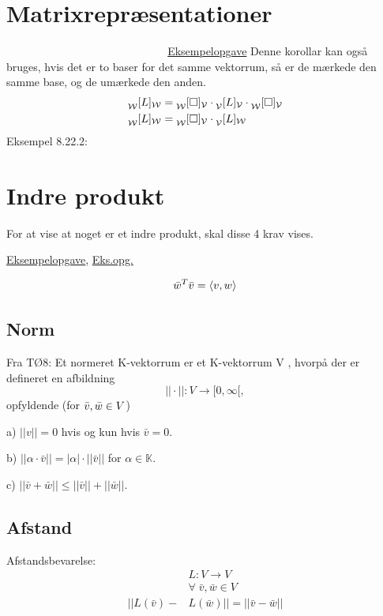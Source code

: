 \documentclass[a4paper,oneside,article]{memoir}
\begin{document}
\chapter{Matrixrepræsentationer} \label{ch:rep}
\textcolor{white}{Koordinattransformationsmatrix}
\hyperref[asc:Reeksamen 2021 opg 1]{Eksempelopgave}
Denne korollar kan også bruges, hvis det er to baser for det samme vektorrum, så er de mærkede den samme base, og de umærkede den anden. 
\begin{align*}
    \prescript{}{\mathcal{W}}[L]_\mathcal{W} &= \prescript{}{\mathcal{W}}[\Box]_\mathcal{V}\cdot \prescript{}{\mathcal{V}}[L]_\mathcal{V}\cdot \prescript{}{\mathcal{W}}[\Box]_\mathcal{V} \\
    \prescript{}{\mathcal{W}}[L]_\mathcal{W} &= \prescript{}{\mathcal{W}}[\Box]_\mathcal{V}\cdot \prescript{}{\mathcal{V}}[L]_\mathcal{W}
\end{align*}
Eksempel 8.22.2: 



\chapter{Indre produkt} \label{ch:indre} 
For at vise at noget er et indre produkt, skal disse 4 krav vises. 

\hyperref[asc:Reeksamen 2023 opg 2]{Eksempelopgave}, \hyperref[asc:Eksamen 2022 opg 3]{Eks.opg.}

\[\bar{w}^T\bar{v}=\br[3]{v,w}\]

\section{Norm}
Fra TØ8: 
Et normeret K-vektorrum er et K-vektorrum V , hvorpå der er defineret en afbildning
\[||\cdot|| : V \rightarrow [0, \infty [,\]
opfyldende (for $\Bar{v}, \Bar{w} \in V $)

a) $||v|| = 0$ hvis og kun hvis $\bar{v} = 0$.

b) $||α \cdot \bar{v}|| = |α| \cdot ||\bar{v}||$ for $α \in \mathbb{K}$.

c) $||\bar{v} + \bar{w}|| \leq ||\bar{v}|| + ||\bar{w}||$.


\section{Afstand}
Afstandsbevarelse: 
\begin{align*}
    & L: V \rightarrow V \\
    & \forall \; \bar{v}, \bar{w} \in V \\
    ||L(\bar{v})- & L(\bar{w})|| = ||\bar{v}-\bar{w}||
\end{align*}
\end{document}
